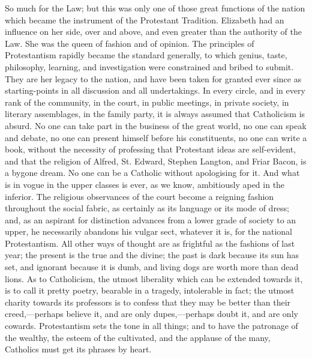 So much for the Law; but this was only one of those
great functions of the nation which became the instrument
of the Protestant Tradition. Elizabeth had an influence
on her side, over and above, and even greater than the
authority of the Law. She was the queen of fashion and of
opinion. The principles of Protestantism rapidly became
the standard generally, to which genius, taste,
philosophy, learning, and investigation were constrained
and bribed to submit. They are her legacy to the nation,
and have been taken for granted ever since as
starting-points in all discussion and all undertakings.
In every circle, and in every rank of the community, in
the court, in public meetings, in private society, in
literary assemblages, in the family party, it is always
assumed that Catholicism is absurd. No one can take part
in the business of the great world, no one can speak and
debate, no one can present himself before his
constituents, no one can write a book, without the
necessity of professing that Protestant ideas are
self-evident, and that the religion of Alfred, St.
Edward, Stephen Langton, and Friar Bacon, is a bygone
dream. No one can be a Catholic without apologising for
it. And what is in vogue in the upper classes is ever, as
we know, ambitiously aped in the inferior. The religious
observances of the court become a reigning fashion
throughout the social fabric, as certainly as its
language or its mode of dress; and, as an aspirant for
distinction advances from a lower grade of society to an
upper, he necessarily abandons his vulgar sect, whatever
it is, for the national Protestantism. All other ways of
thought are as frightful as the fashions of last year;
the present is the true and the divine; the past is dark
because its sun has set, and ignorant because it is dumb,
and living dogs are worth more than dead lions. As to
Catholicism, the utmost liberality which can be extended
towards it, is to call it pretty poetry, bearable in a
tragedy, intolerable in fact; the utmost charity towards
its professors is to confess that they may be better than
their creed,—perhaps believe it, and are only
dupes,—perhaps doubt it, and are only cowards.
Protestantism sets the tone in all things; and to have
the patronage of the wealthy, the esteem of the
cultivated, and the applause of the many, Catholics must
get its phrases by heart.

